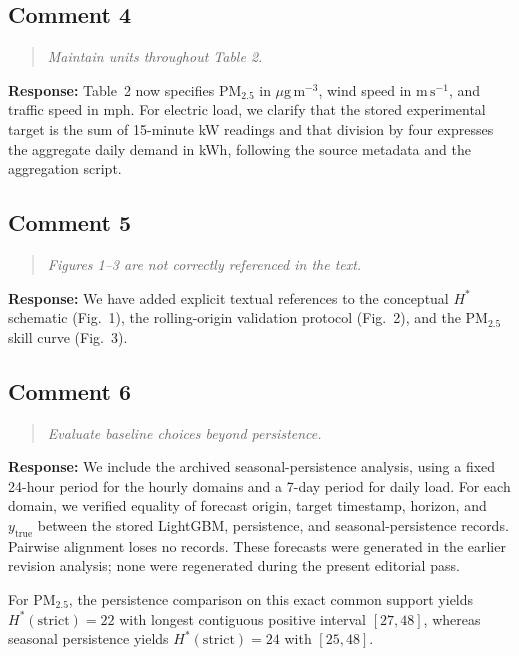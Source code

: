 \documentclass[11pt,a4paper]{article}
\newenvironment{reviewcomment}
  {\begin{quote}\itshape}
  {\end{quote}}
\newcommand{\response}{\noindent\textbf{Response:} }
\begin{document}
\subsection*{Comment 4}

\begin{reviewcomment}
Maintain units throughout Table 2.
\end{reviewcomment}

\response
Table~2 now specifies PM$_{2.5}$ in $\mu\mathrm{g\,m^{-3}}$, wind speed in
$\mathrm{m\,s^{-1}}$, and traffic speed in mph. For electric load, we clarify that the
stored experimental target is the sum of 15-minute kW readings and that
division by four expresses the aggregate daily demand in kWh, following the source
metadata and the aggregation script.


\subsection*{Comment 5}

\begin{reviewcomment}
Figures 1--3 are not correctly referenced in the text.
\end{reviewcomment}

\response
We have added explicit textual references to the conceptual $H^*$ schematic
(Fig.~1), the rolling-origin validation protocol (Fig.~2), and the
PM$_{2.5}$ skill curve (Fig.~3).


\subsection*{Comment 6}

\begin{reviewcomment}
Evaluate baseline choices beyond persistence.
\end{reviewcomment}

\response
We include the archived seasonal-persistence analysis, using a fixed
24-hour period for the hourly domains and a 7-day period for daily load.
For each domain, we verified equality of forecast origin, target timestamp,
horizon, and $y_{\mathrm{true}}$ between the stored LightGBM, persistence,
and seasonal-persistence records. Pairwise alignment loses no records.
These forecasts were generated in the earlier revision analysis; none
were regenerated during the present editorial pass.

For PM$_{2.5}$, the persistence comparison on this exact common support yields
$H^*(\mathrm{strict})=22$ with longest contiguous positive interval $[27,48]$,
whereas seasonal persistence yields $H^*(\mathrm{strict})=24$ with $[25,48]$.
\end{document}
